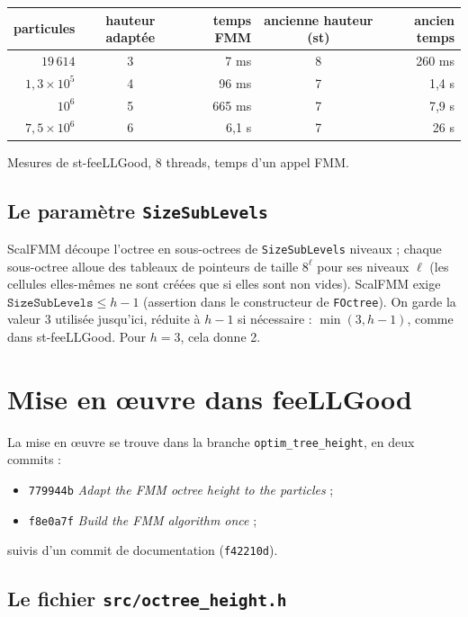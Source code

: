 \documentclass[11pt,a4paper]{article}
\newcommand{\code}[1]{\texttt{#1}}
\begin{document}
\begin{center}
\begin{tabular}{rcrcr}
\toprule
particules & hauteur adaptée & temps FMM & ancienne hauteur (st) & ancien temps \\
\midrule
$19\,614$ & 3 & 7 ms & 8 & 260 ms \\
$1{,}3\times 10^5$ & 4 & 96 ms & 7 & 1,4 s \\
$10^6$ & 5 & 665 ms & 7 & 7,9 s \\
$7{,}5\times 10^6$ & 6 & 6,1 s & 7 & 26 s \\
\bottomrule
\end{tabular}

\smallskip
{\small Mesures de st-feeLLGood, 8 threads, temps d'un appel FMM.}
\end{center}

\subsection{\texorpdfstring{Le paramètre \code{SizeSubLevels}}{Le paramètre SizeSubLevels}}

ScalFMM découpe l'octree en sous-octrees de \code{SizeSubLevels} niveaux ; chaque sous-octree
alloue des tableaux de pointeurs de taille $8^\ell$ pour ses niveaux $\ell$ (les cellules
elles-mêmes ne sont créées que si elles sont non vides). ScalFMM exige
$\code{SizeSubLevels} \le h - 1$ (assertion dans le constructeur de \code{FOctree}). On garde la
valeur 3 utilisée jusqu'ici, réduite à $h - 1$ si nécessaire : $\min(3, h-1)$, comme dans
st-feeLLGood. Pour $h = 3$, cela donne 2.

\section{Mise en œuvre dans feeLLGood}

La mise en œuvre se trouve dans la branche \code{optim\_tree\_height}, en deux commits :
\begin{itemize}
  \item \code{779944b} \emph{Adapt the FMM octree height to the particles} ;
  \item \code{f8e0a7f} \emph{Build the FMM algorithm once} ;
\end{itemize}
suivis d'un commit de documentation (\code{f42210d}).

\subsection{\texorpdfstring{Le fichier \code{src/octree\_height.h}}{Le fichier src/octree\_height.h}}
\end{document}
